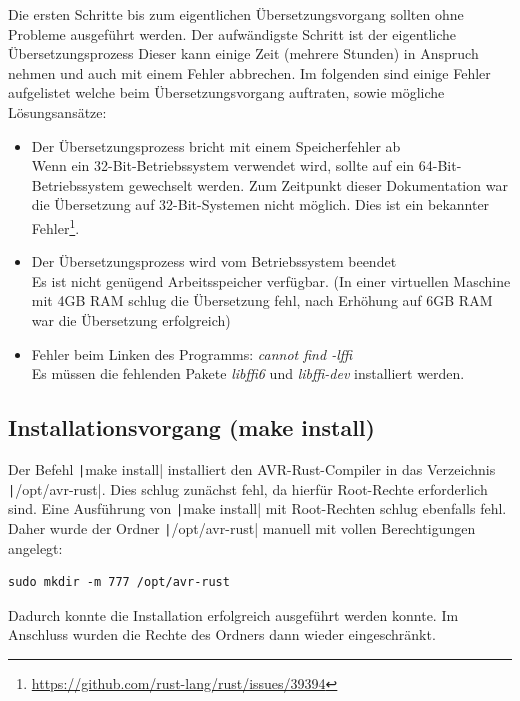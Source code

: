 \documentclass
[ 12pt,
  parskip=half %
]{scrreprt}
\begin{document}
Die ersten Schritte bis zum eigentlichen Übersetzungsvorgang sollten ohne Probleme ausgeführt werden. Der aufwändigste Schritt ist der eigentliche Übersetzungsprozess Dieser kann einige Zeit (mehrere Stunden) in Anspruch nehmen und auch mit einem Fehler abbrechen. Im folgenden sind einige Fehler aufgelistet welche beim Übersetzungsvorgang auftraten, sowie mögliche Lösungsansätze:

\begin{itemize}
	\item Der Übersetzungsprozess bricht mit einem Speicherfehler ab 
		\smallskip \\
		Wenn ein 32-Bit-Betriebssystem verwendet wird, sollte auf ein 64-Bit-Betriebssystem gewechselt werden. Zum Zeitpunkt dieser Dokumentation war die Übersetzung auf 32-Bit-Systemen nicht möglich. Dies ist ein bekannter Fehler\footnote{\url{https://github.com/rust-lang/rust/issues/39394}}.
	\item Der Übersetzungsprozess wird vom Betriebssystem beendet 
	\smallskip \\
	Es ist nicht genügend Arbeitsspeicher verfügbar. (In einer virtuellen Maschine mit 4GB RAM schlug die Übersetzung fehl, nach Erhöhung auf 6GB RAM war die Übersetzung erfolgreich)
	\item Fehler beim Linken des Programms: \textit{cannot find -lffi}
	\smallskip \\
	Es müssen die fehlenden Pakete \textit{libffi6} und \textit{libffi-dev} installiert werden.
\end{itemize}

\subsection{Installationsvorgang (make install)}

Der Befehl \texttt|make install| installiert den AVR-Rust-Compiler in das Verzeichnis \texttt|/opt/avr-rust|. Dies schlug zunächst fehl, da hierfür Root-Rechte erforderlich sind. Eine Ausführung von \texttt|make install| mit Root-Rechten schlug ebenfalls fehl. Daher wurde der Ordner \texttt|/opt/avr-rust| manuell mit vollen Berechtigungen angelegt: 
\begin{verbatim}
sudo mkdir -m 777 /opt/avr-rust
\end{verbatim}

Dadurch konnte die Installation erfolgreich ausgeführt werden konnte. Im Anschluss wurden die Rechte des Ordners dann wieder eingeschränkt.
\end{document}
